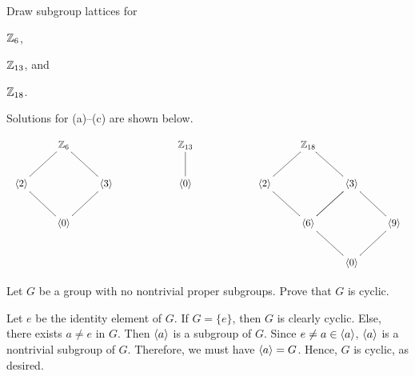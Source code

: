 \begin{exercise}
Draw subgroup lattices for \begin{inparaenum}[(a)]
\item $\mathbb{Z}_6$,
\item $\mathbb{Z}_{13}$, and
\item $\mathbb{Z}_{18}$.
\end{inparaenum}
\end{exercise}

\begin{solution}[print=true]
Solutions for (a)--(c) are shown below.

$$\begin{array}{lll}\xymatrix{&\Z_6&\\\<2\>\ar@{-}[ur]&&\<3\>\ar@{-}[ul]\\&\<0\>\ar@{-}[ul]\ar@{-}[ur]&}& \hspace{50pt}
\xymatrix{\Z_{13}\ar@{-}[d]\\ \<0\>}& \hspace{50pt}  \xymatrix{&\Z_{18}&&\\\<2\>\ar@{-}[ur]\ar@{-}[dr]&&\<3\>\ar@{-}[ul]\ar@{-}[dl]&\\
&\<6\>\ar@{-}[dr]\ar@{-}[ur]&&\<9\>\ar@{-}[dl]\ar@{-}[ul]\\&&\<0\>&}\end{array}$$
\end{solution}

\begin{exercise}
Let $G$ be a group with no nontrivial proper subgroups.  Prove that $G$ is cyclic.
\end{exercise}

\begin{solution}[print=true]
 Let $e$ be the identity
    element of $G$. If $G=\{e\}$, then $G$ is clearly
    cyclic. Else, there exists $a\neq e$ in $G$. Then
    $\langle a\rangle$ is a subgroup of $G$.  Since $e\neq a\in
    \langle a\rangle$, $\langle a\rangle$ is a nontrivial subgroup of $G$. Therefore, we must have
    $\langle a\rangle=G$. Hence, $G$ is cyclic, as desired.
\end{solution}